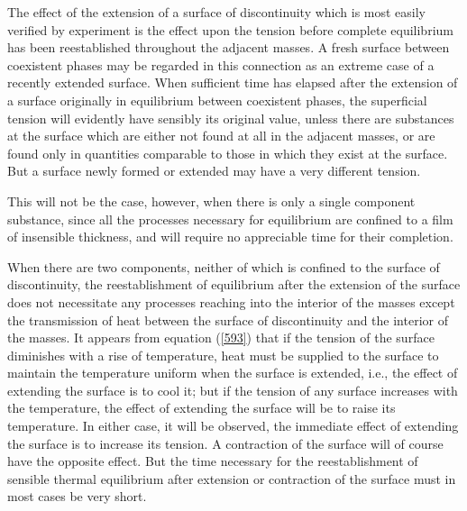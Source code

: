 \documentclass[12pt]{article}
\begin{document}
{The effect of the extension of a surface of discontinuity which is most easily verified by experiment is the effect upon the tension before complete equilibrium has been reestablished throughout the adjacent masses. A fresh surface between coexistent phases may be regarded in this connection as an extreme case of a recently extended surface. When sufficient time has elapsed after the extension of a surface originally in equilibrium between coexistent phases, the superficial tension will evidently have sensibly its original value, unless there are substances at the surface which are either not found at all in the adjacent masses, or are found only in quantities comparable to those in which they exist at the surface. But a surface newly formed or extended may have a very different tension.

This will not be the case, however, when there is only a single component substance, since all the processes necessary for equilibrium are confined to a film of insensible thickness, and will require no appreciable time for their completion.

When there are two components, neither of which is confined to the surface of discontinuity, the reestablishment of equilibrium after the extension of the surface does not necessitate any processes reaching into the interior of the masses except the transmission of heat between the surface of discontinuity and the interior of the masses. It appears from equation (\ref{593}) that if the tension of the surface diminishes with a rise of temperature, heat must be supplied to the surface to maintain the temperature uniform when the surface is extended, i.e., the effect of extending the surface is to cool it; but if the tension of any surface increases with the temperature, the effect of extending the surface will be to raise its temperature. In either case, it will be observed, the immediate effect of extending the surface is to increase its tension. A contraction of the surface will of course have the opposite effect.  But the time necessary for the reestablishment of sensible thermal equilibrium after extension or contraction of the surface must in most cases be very short.

}
\end{document}
